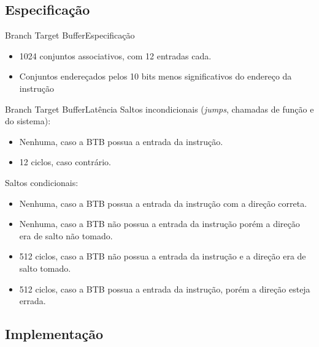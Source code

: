 \documentclass{beamer}
\begin{document}
\subsection{Especificação}

\begin{frame}{Branch Target Buffer}{Especificação}
	\begin{itemize}
		\item 1024 conjuntos associativos, com 12 entradas cada.
		\item Conjuntos endereçados pelos 10 bits menos significativos do endereço
		      da instrução
	\end{itemize}
\end{frame}

\begin{frame}{Branch Target Buffer}{Latência}
	Saltos incondicionais (\textit{jumps}, chamadas de função e do sistema):
	\begin{itemize}
		\item Nenhuma, caso a BTB possua a entrada da instrução.
		\item 12 ciclos, caso contrário.
	\end{itemize}

	\vfill

	Saltos condicionais:
	\begin{itemize}
		\item Nenhuma, caso a BTB possua a entrada da instrução com a direção
		      correta.
		\item Nenhuma, caso a BTB não possua a entrada da instrução porém a direção
		      era de salto não tomado.
		\item 512 ciclos, caso a BTB não possua a entrada da instrução e a direção
		      era de salto tomado.
		\item 512 ciclos, caso a BTB possua a entrada da instrução, porém a direção
		      esteja errada.
	\end{itemize}
\end{frame}

\subsection{Implementação}
\end{document}
